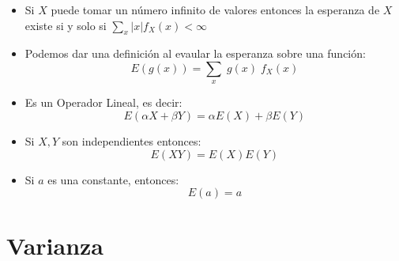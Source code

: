 \documentclass[12pt, fleqn]{report}                             %
\theoremstyle{break}                                            %
\begin{document}
                \begin{itemize}

                    \item 
                        Si $X$ puede tomar un número infinito de valores entonces la esperanza de 
                        $X$ existe si y solo si $\displaystyle \sum_x |x| f_X(x) < \infty$

                    \item
                        Podemos dar una definición al evaular la esperanza sobre una función:
                        \begin{equation*}
                            E(g(x)) = \sum_x \; g(x) \; f_X(x)    
                        \end{equation*}

                    \item Es un Operador Lineal, es decir:
                        \begin{equation*}
                            E(\alpha X + \beta Y) = \alpha E(X) + \beta E(Y)   
                        \end{equation*}

                    \item
                        Si $X, Y$ son independientes entonces:
                        \begin{equation*}
                            E(XY) = E(X) E(Y)  
                        \end{equation*}

                    \item
                        Si $a$ es una constante, entonces: 
                        \begin{equation*}
                            E(a) = a
                        \end{equation*}

                \end{itemize}


        \clearpage
        \section{Varianza}

\end{document}
